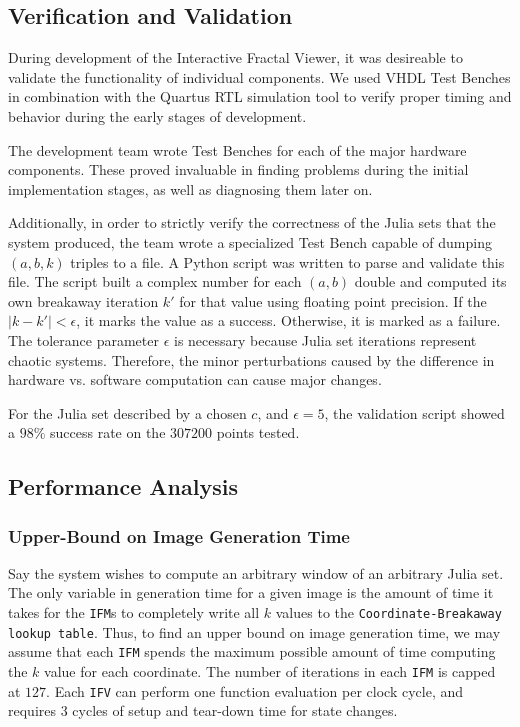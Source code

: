 \documentclass{article}
\begin{document}
\subsection{Verification and Validation}

During development of the Interactive Fractal Viewer, it was desireable to validate the functionality of
individual components. We used VHDL Test Benches in combination with the Quartus RTL simulation tool to verify proper timing and behavior during the early stages of development.

The development team wrote Test Benches for each of the major hardware components. These proved invaluable in 
finding problems during the initial implementation stages, as well as diagnosing them later on. 

Additionally, in order to strictly verify the correctness of the Julia sets that the system produced, the team wrote a 
specialized Test Bench capable of dumping $(a, b, k)$  triples to a file. A Python
script was written to parse and validate this file. The script built a complex number for each $(a, b)$ double 
and computed its own breakaway iteration $k'$ for that value using floating point precision. If the $|k-k'|<\epsilon$, 
it marks the value as a success. Otherwise, it is marked as a failure. The tolerance parameter $\epsilon$ is necessary
because Julia set iterations represent chaotic systems. Therefore, the minor perturbations caused by the difference
in hardware vs. software computation can cause major changes.

For the Julia set described by a chosen $c$, and $\epsilon = 5$, the validation script showed a $98$\% success rate on
the $307200$ points tested.

\subsection{Performance Analysis}

\subsubsection{Upper-Bound on Image Generation Time}

Say the system wishes to compute an arbitrary window of an arbitrary Julia set. The only variable in generation time for a given
image is the amount of time it takes for the \texttt{IFM}s to completely write all $k$ values to the \texttt{Coordinate-Breakaway lookup table}. Thus, to find an upper bound on image generation time, we may assume that
each \texttt{IFM} spends the maximum possible amount of time computing the $k$ value for each coordinate. The 
number of iterations in each \texttt{IFM} is capped at $127$. Each \texttt{IFV} can perform one function evaluation
per clock cycle, and requires $3$ cycles of setup and tear-down time for state changes. 
\end{document}

